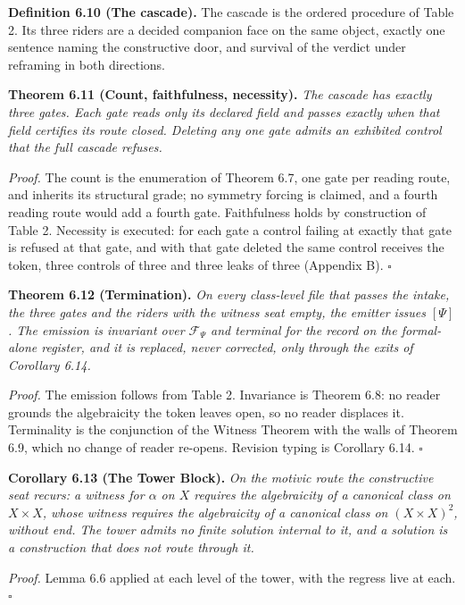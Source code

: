 \documentclass[10pt,twocolumn]{article}
\begin{document}
\textbf{Definition 6.10 (The cascade).} The cascade is the ordered
procedure of Table 2. Its three riders are a decided companion face on
the same object, exactly one sentence naming the constructive door, and
survival of the verdict under reframing in both directions.

\textbf{Theorem 6.11 (Count, faithfulness, necessity).} \emph{The
cascade has exactly three gates. Each gate reads only its declared field
and passes exactly when that field certifies its route closed. Deleting
any one gate admits an exhibited control that the full cascade refuses.}

\emph{Proof.} The count is the enumeration of Theorem 6.7, one gate per
reading route, and inherits its structural grade; no symmetry forcing is
claimed, and a fourth reading route would add a fourth gate.
Faithfulness holds by construction of Table 2. Necessity is executed:
for each gate a control failing at exactly that gate is refused at that
gate, and with that gate deleted the same control receives the token,
three controls of three and three leaks of three (Appendix B).
\(\square\)

\textbf{Theorem 6.12 (Termination).} \emph{On every class-level file
that passes the intake, the three gates and the riders with the witness
seat empty, the emitter issues \([\Psi]\). The emission is invariant
over \(\mathcal{F}_\Psi\) and terminal for the record on the
formal-alone register, and it is replaced, never corrected, only through
the exits of Corollary 6.14.}

\emph{Proof.} The emission follows from Table 2. Invariance is Theorem
6.8: no reader grounds the algebraicity the token leaves open, so no
reader displaces it. Terminality is the conjunction of the Witness
Theorem with the walls of Theorem 6.9, which no change of reader
re-opens. Revision typing is Corollary 6.14. \(\square\)

\textbf{Corollary 6.13 (The Tower Block).} \emph{On the motivic route
the constructive seat recurs: a witness for \(\alpha\) on \(X\) requires
the algebraicity of a canonical class on \(X\times X\), whose witness
requires the algebraicity of a canonical class on \((X\times X)^2\),
without end. The tower admits no finite solution internal to it, and a
solution is a construction that does not route through it.}

\emph{Proof.} Lemma 6.6 applied at each level of the tower, with the
regress live at each. \(\square\)
\end{document}
